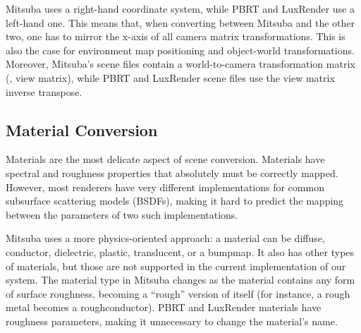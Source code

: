 Mitsuba uses a right-hand coordinate system, while PBRT and LuxRender use a
left-hand one. This means that, when converting between Mitsuba and the other
two, one has to mirror the x-axis of all camera matrix transformations. This is
also the case for environment map positioning and object-world
transformations. Moreover, Mitsuba's scene files contain a world-to-camera transformation matrix (\ie, view matrix),
while PBRT and LuxRender scene files use the view matrix inverse transpose.



\subsection{Material Conversion}
Materials are the most delicate aspect of scene conversion. Materials have
spectral and roughness properties that absolutely must be correctly mapped. 
However, most renderers have very different implementations
for common subsurface scattering models (BSDFs), making it hard to
predict the mapping between the parameters of two such implementations.

Mitsuba uses a more physics-oriented approach: a material can be diffuse,
conductor, dielectric, plastic, translucent, or a bumpmap.
It also has other types of materials, but those are not supported in the current implementation of our system.
The material type in Mitsuba changes as the material contains any form of
surface roughness, becoming a ``rough'' version of itself (for instance, a rough
metal becomes a roughconductor).
%
PBRT and LuxRender materials have roughness parameters, making it unnecessary to
change the material's name.

